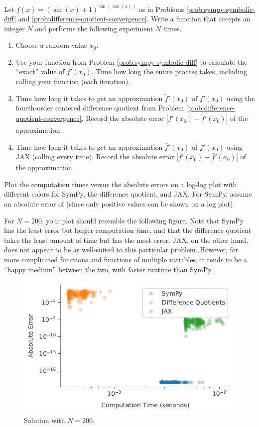 \begin{problem} %
Let $f(x) = (\sin(x) + 1)^{\sin(\cos(x))}$ as in Problems \ref{prob:sympy-symbolic-diff} and \ref{prob:difference-quotient-convergence}.
Write a function that accepts an integer $N$ and performs the following experiment $N$ times.
\begin{enumerate}
\item Choose a random value $x_0$.
\item Use your function from Problem \ref{prob:sympy-symbolic-diff} to calculate the ``exact'' value of $f'(x_0)$.
Time how long the entire process takes, including calling your function (each iteration).
\item Time how long it takes to get an approximation $\tilde{f}'(x_0)$ of $f'(x_0)$ using the fourth-order centered difference quotient from Problem \ref{prob:difference-quotient-convergence}.
Record the absolute error $|f'(x_0) - \tilde{f}'(x_0)|$ of the approximation.
\item Time how long it takes to get an approximation $\bar{f}'(x_0)$ of $f'(x_0)$ using JAX (calling  every time).
Record the absolute error $|f'(x_0) - \bar{f}'(x_0)|$ of the approximation.
\end{enumerate}

Plot the computation times versus the absolute errors on a log-log plot with different colors for SymPy, the difference quotient, and JAX.
For SymPy, assume an absolute error of  (since only positive values can be shown on a log plot).

For $N=200$, your plot should resemble the following figure.
Note that SymPy has the least error but longer computation time, and that the difference quotient takes the least amount of time but has the most error.
JAX, on the other hand, does not appear to be as well-suited to this particular problem.
However, for more complicated functions and functions of multiple variables, it tends to be a ``happy medium'' between the two, with faster runtime than SymPy.

\begin{figure}[H]
    \includegraphics[width=.7\textwidth]{figures/efficiency.pdf}
    \caption{Solution with $N = 200$.}
\end{figure}
\end{problem}

